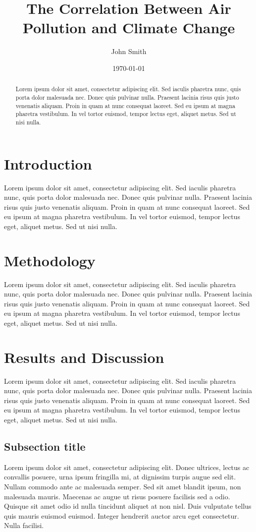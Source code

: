 \documentclass[12pt]{article}
\title{The Correlation Between Air Pollution and Climate Change}
\author{John Smith}
\date{\today}
\begin{document}
\maketitle

\begin{abstract}
Lorem ipsum dolor sit amet, consectetur adipiscing elit. Sed iaculis pharetra nunc, quis porta dolor malesuada nec. Donec quis pulvinar nulla. Praesent lacinia risus quis justo venenatis aliquam. Proin in quam at nunc consequat laoreet. Sed eu ipsum at magna pharetra vestibulum. In vel tortor euismod, tempor lectus eget, aliquet metus. Sed ut nisi nulla. 
\end{abstract}

\onehalfspacing

\section{Introduction}
Lorem ipsum dolor sit amet, consectetur adipiscing elit. Sed iaculis pharetra nunc, quis porta dolor malesuada nec. Donec quis pulvinar nulla. Praesent lacinia risus quis justo venenatis aliquam. Proin in quam at nunc consequat laoreet. Sed eu ipsum at magna pharetra vestibulum. In vel tortor euismod, tempor lectus eget, aliquet metus. Sed ut nisi nulla.

\section{Methodology}
Lorem ipsum dolor sit amet, consectetur adipiscing elit. Sed iaculis pharetra nunc, quis porta dolor malesuada nec. Donec quis pulvinar nulla. Praesent lacinia risus quis justo venenatis aliquam. Proin in quam at nunc consequat laoreet. Sed eu ipsum at magna pharetra vestibulum. In vel tortor euismod, tempor lectus eget, aliquet metus. Sed ut nisi nulla.

\section{Results and Discussion}
Lorem ipsum dolor sit amet, consectetur adipiscing elit. Sed iaculis pharetra nunc, quis porta dolor malesuada nec. Donec quis pulvinar nulla. Praesent lacinia risus quis justo venenatis aliquam. Proin in quam at nunc consequat laoreet. Sed eu ipsum at magna pharetra vestibulum. In vel tortor euismod, tempor lectus eget, aliquet metus. Sed ut nisi nulla.

\subsection{Subsection title}
Lorem ipsum dolor sit amet, consectetur adipiscing elit. Donec ultrices, lectus ac convallis posuere, urna ipsum fringilla mi, at dignissim turpis augue sed elit. Nullam commodo ante ac malesuada semper. Sed sit amet blandit ipsum, non malesuada mauris. Maecenas ac augue ut risus posuere facilisis sed a odio. Quisque sit amet odio id nulla tincidunt aliquet at non nisl. Duis vulputate tellus quis mauris euismod euismod. Integer hendrerit auctor arcu eget consectetur. Nulla facilisi.
\end{document}
